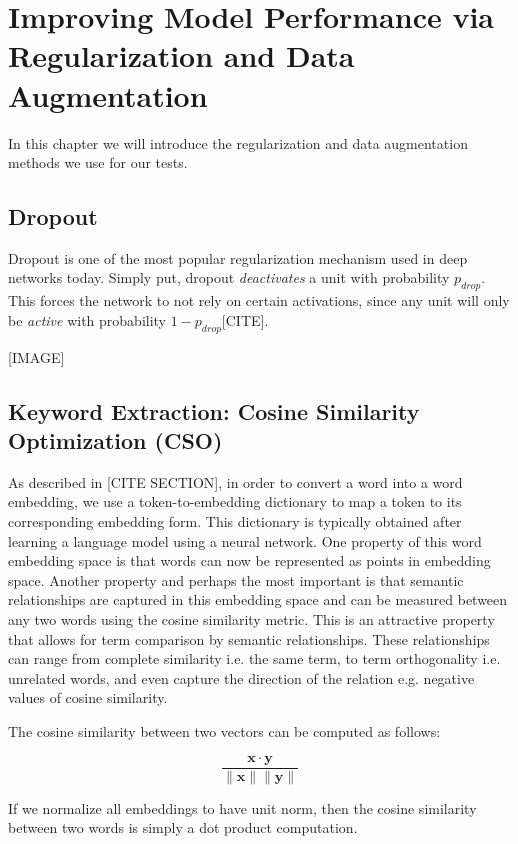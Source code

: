 
\chapter{Improving Model Performance via Regularization and Data Augmentation}

In this chapter we will introduce the regularization and data augmentation methods
we use for our tests.


\section{Dropout}
Dropout is one of the most popular regularization mechanism used in deep networks today.
Simply put, dropout \textit{deactivates} a unit with probability $p_{drop}$. This forces the network to not rely on certain
activations, since any unit will only be \textit{active} with probability $1-p_{drop}$[CITE].

[IMAGE]

\section{Keyword Extraction: Cosine Similarity Optimization (CSO)}
As described in [CITE SECTION], in order to convert a word into a word embedding, we use a token-to-embedding dictionary to map a token to its corresponding embedding form.
This dictionary is typically obtained after learning a language model using a neural network. One property of this word embedding space is that
words can now be represented as points in embedding space. Another property and perhaps the most important is that semantic relationships are captured
in this embedding space and can be measured between any two words using the cosine similarity metric. This is an attractive property that
allows for term comparison by semantic relationships. These relationships can range from complete similarity i.e. the same term, to term orthogonality
i.e. unrelated words, and even capture the direction of the relation e.g. negative values of cosine similarity.

The cosine similarity between two vectors can be computed as follows:

\[
  \frac{\mathbf{x} \cdot \mathbf{y}}{\lVert \mathbf{x} \rVert \lVert \mathbf{y} \rVert}
\]

If we normalize all embeddings to have unit norm, then the cosine similarity between two words is simply a dot product computation.



